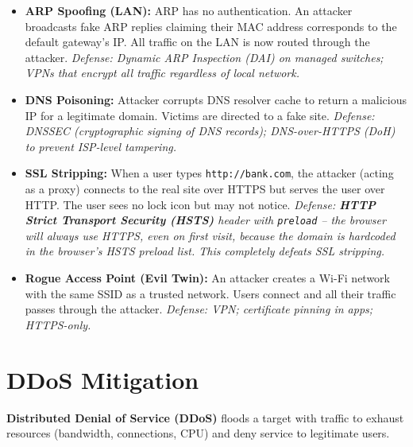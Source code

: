 \documentclass[11pt, letterpaper]{article}
\begin{document}
\begin{itemize}[noitemsep]
  \item \textbf{ARP Spoofing (LAN):} ARP has no authentication. An attacker broadcasts fake ARP replies claiming their MAC address corresponds to the default gateway's IP. All traffic on the LAN is now routed through the attacker. \textit{Defense: Dynamic ARP Inspection (DAI) on managed switches; VPNs that encrypt all traffic regardless of local network.}

  \item \textbf{DNS Poisoning:} Attacker corrupts DNS resolver cache to return a malicious IP for a legitimate domain. Victims are directed to a fake site. \textit{Defense: DNSSEC (cryptographic signing of DNS records); DNS-over-HTTPS (DoH) to prevent ISP-level tampering.}

  \item \textbf{SSL Stripping:} When a user types \texttt{http://bank.com}, the attacker (acting as a proxy) connects to the real site over HTTPS but serves the user over HTTP. The user sees no lock icon but may not notice. \textit{Defense: \textbf{HTTP Strict Transport Security (HSTS)} header with \texttt{preload} -- the browser will always use HTTPS, even on first visit, because the domain is hardcoded in the browser's HSTS preload list. This completely defeats SSL stripping.}

  \item \textbf{Rogue Access Point (Evil Twin):} An attacker creates a Wi-Fi network with the same SSID as a trusted network. Users connect and all their traffic passes through the attacker. \textit{Defense: VPN; certificate pinning in apps; HTTPS-only.}
\end{itemize}

\section*{DDoS Mitigation}

\textbf{Distributed Denial of Service (DDoS)} floods a target with traffic to exhaust resources (bandwidth, connections, CPU) and deny service to legitimate users.
\end{document}
